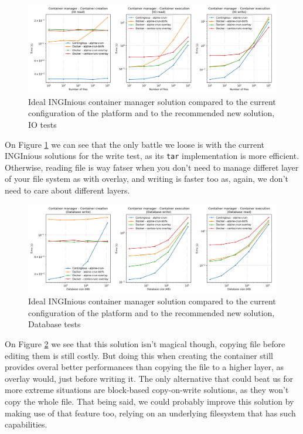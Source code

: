 \begin{figure}[h!]
  \begin{center}
    \includegraphics[width=\linewidth]{images/question-2-io.png}
    \caption{Ideal INGInious container manager solution compared to the current configuration of the platform and to the recommended new solution, IO tests}
    \label{fig:q2:io}
  \end{center}
\end{figure}

On Figure \ref{fig:q2:io} we can see that the only battle we loose is with the current INGInious solutions for the write test, as its \texttt{tar} implementation is more efficient.  Otherwise, reading file is way fatser when you don't need to manage differet layer of your file system as with overlay, and writing is faster too as, again, we don't need to care about different layers.

\begin{figure}[h!]
  \begin{center}
    \includegraphics[width=\linewidth]{images/question-2-db.png}
    \caption{Ideal INGInious container manager solution compared to the current configuration of the platform and to the recommended new solution, Database tests}
    \label{fig:q2:db}
  \end{center}
\end{figure}

On Figure \ref{fig:q2:db} we see that this solution isn't magical though, copying file before editing them is still costly.  But doing this when creating the container still provides overal better performances than copying the file to a higher layer, as overlay would, just before writing it.  The only alternative that could beat us for more extreme situations are block-based copy-on-write solutions, as they won't copy the whole file.  That being said, we could probably improve this solution by making use of that feature too, relying on an underlying filesystem that has such capabilities.

